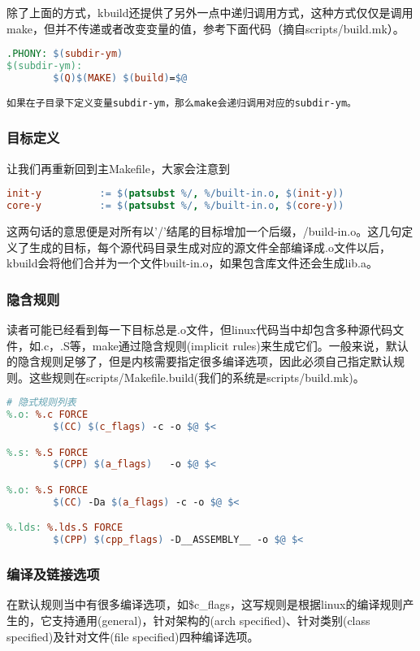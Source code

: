 除了上面的方式，kbuild还提供了另外一点中递归调用方式，这种方式仅仅是调用make，但并不传递或者改变变量的值，参考下面代码（摘自scripts/build.mk）。
\begin{lstlisting}[language=make]
.PHONY: $(subdir-ym)
$(subdir-ym):
        $(Q)$(MAKE) $(build)=$@

如果在子目录下定义变量subdir-ym，那么make会递归调用对应的subdir-ym。
\end{lstlisting}
\subsubsection{目标定义}
让我们再重新回到主Makefile，大家会注意到
\begin{lstlisting}[language=make]
init-y          := $(patsubst %/, %/built-in.o, $(init-y))
core-y          := $(patsubst %/, %/built-in.o, $(core-y))
\end{lstlisting}
这两句话的意思便是对所有以'/'结尾的目标增加一个后缀，/build-in.o。这几句定义了生成的目标，每个源代码目录生成对应的源文件全部编译成.o文件以后，kbuild会将他们合并为一个文件built-in.o，如果包含库文件还会生成lib.a。

\subsubsection{隐含规则}
读者可能已经看到每一下目标总是.o文件，但linux代码当中却包含多种源代码文件，如.c，.S等，make通过隐含规则(implicit rules)来生成它们。一般来说，默认的隐含规则足够了，但是内核需要指定很多编译选项，因此必须自己指定默认规则。这些规则在scripts/Makefile.build(我们的系统是scripts/build.mk)。

\begin{lstlisting}[language=make]
# 隐式规则列表
%.o: %.c FORCE
        $(CC) $(c_flags) -c -o $@ $<

%.s: %.S FORCE
        $(CPP) $(a_flags)   -o $@ $<

%.o: %.S FORCE
        $(CC) -Da $(a_flags) -c -o $@ $<

%.lds: %.lds.S FORCE
        $(CPP) $(cpp_flags) -D__ASSEMBLY__ -o $@ $<
\end{lstlisting}

\subsubsection{编译及链接选项}
在默认规则当中有很多编译选项，如\${c\_flags}，这写规则是根据linux的编译规则产生的，它支持通用(general)，针对架构的(arch specified)、针对类别(class specified)及针对文件(file specified)四种编译选项。

